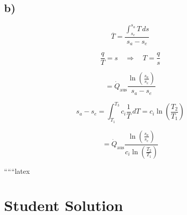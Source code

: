 

\subsection*{b)}

\[
\overline{T} = \frac{\int_{s_e}^{s_a} T \, ds}{s_a - s_e}
\]

\[
\frac{q}{T} = s \quad \Rightarrow \quad T = \frac{q}{s}
\]

\[
= \dot{Q}_{\text{aus}} \frac{\ln \left( \frac{s_a}{s_e} \right)}{s_a - s_e}
\]

\[
s_a - s_e = \int_{T_1}^{T_3} c_i \frac{1}{T} \, dT = c_i \ln \left( \frac{T_2}{T_1} \right)
\]

\[
= \dot{Q}_{\text{aus}} \frac{\ln \left( \frac{s_a}{s_e} \right)}{c_i \ln \left( \frac{T_2}{T_1} \right)}
\]

``````latex


\section*{Student Solution}